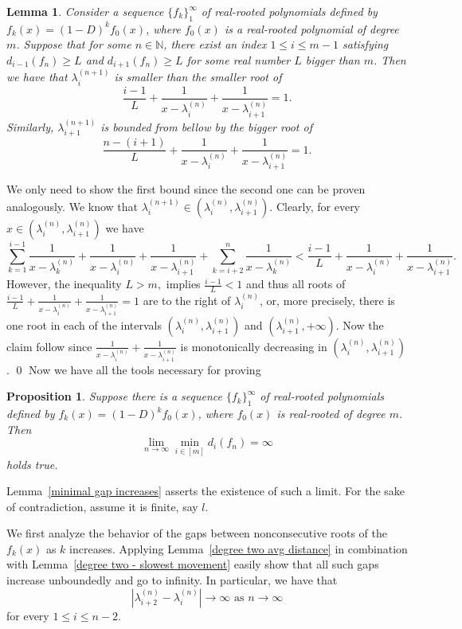\documentclass[11pt]{article}
\newtheorem{lemma}[theorem]{Lemma}
\newtheorem{proposition}[theorem]{Proposition}
\begin{document}
\begin{lemma}
\label{minimal gap shall approach}
 Consider a sequence $\{f_k\}_1^\infty$ of real-rooted polynomials defined by $f_k(x) = (1-D)^k f_0(x)$, where $f_0(x)$ is a real-rooted polynomial of degree~$m$. Suppose that for some $n\in\mathbb{N}$, there exist an index $1\leq i\leq m-1$ satisfying $d_{i-1}(f_n) \geq L$ and $d_{i+1}(f_n) \geq L$ for some real number $L$ bigger than $m$. Then we have that $\lambda^{(n+1)}_i$ is smaller than the smaller root of
 \[\frac{i-1}{L}+\frac{1}{x-\lambda^{(n)}_i} + \frac{1}{x-\lambda^{(n)}_{i+1}} = 1.\]
 Similarly, $\lambda^{(n+1)}_{i+1}$ is bounded from bellow by the bigger root of
 \[\frac{n-(i+1)}{L}+\frac{1}{x-\lambda^{(n)}_i} + \frac{1}{x-\lambda^{(n)}_{i+1}} = 1.\]
\end{lemma}
\proof
We only need to show the first bound since the second one can be proven analogously. We know that $\lambda^{(n+1)}_i\in(\lambda^{(n)}_i,\lambda^{(n)}_{i+1})$. Clearly, for every $x\in (\lambda^{(n)}_i,\lambda^{(n)}_{i+1})$ we have
\[\sum^{i-1}_{k=1} \frac{1}{x-\lambda^{(n)}_k} + \frac{1}{x-\lambda^{(n)}_i} + \frac{1}{x-\lambda^{(n)}_{i+1}} + \sum^n_{k = i+2} \frac{1}{x-\lambda^{(n)}_k} < \frac{i-1}{L}+\frac{1}{x-\lambda^{(n)}_i} + \frac{1}{x-\lambda^{(n)}_{i+1}}.\]
However, the inequality $L > m,$ implies $\frac{i-1}{L}<1$ and thus all roots of $\frac{i-1}{L}+\frac{1}{x-\lambda^{(n)}_i} + \frac{1}{x-\lambda^{(n)}_{i+1}} = 1$ are to the right of $\lambda^{(n)}_i$, or, more precisely, there is one root in each of the intervals $(\lambda^{(n)}_i,\lambda^{(n)}_{i+1})$ and $(\lambda^{(n)}_{i+1},+\infty)$. Now the claim follow since $\frac{1}{x-\lambda^{(n)}_i} + \frac{1}{x-\lambda^{(n)}_{i+1}}$ is monotonically decreasing in $(\lambda^{(n)}_i,\lambda^{(n)}_{i+1})$.
\qed
Now we have all the tools necessary for proving

\begin{proposition}
\label{minimal gap is unbounded}
Suppose there is a sequence $\{f_k\}_1^\infty$ of real-rooted polynomials defined by $f_k(x) = (1-D)^k f_0(x)$, where $f_0(x)$ is real-rooted of degree $m$. Then
\[\lim_{n\to\infty} \min_{i \in [m]} d_i (f_n) = \infty\]
holds true.
\end{proposition}
\proof Lemma~\ref{minimal gap increases} asserts the existence of such a limit. For the sake of contradiction, assume it is finite, say $l$.

We first analyze the behavior of the gaps between nonconsecutive roots of the $f_k(x)$ as $k$ increases. Applying Lemma~\ref{degree two avg distance} in combination with Lemma~\ref{degree two - slowest movement} easily show that all such gaps increase unboundedly and go to infinity. In particular, we have that
\[|\lambda^{(n)}_{i+2} - \lambda^{(n)}_i|\to \infty\text{~as~$n\to\infty$}\]
for every $1\leq i \leq n-2$.
\end{document}
